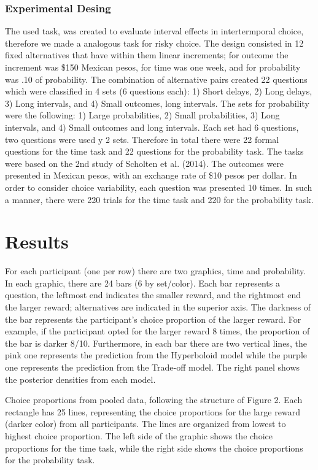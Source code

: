 \documentclass[jou,apacite]{apa6}
\begin{document}
\subsubsection{Experimental Desing}
The used task, was created to evaluate interval effects in intertermporal choice, therefore we made a analogous task for risky choice. The design consisted in 12 fixed alternatives that have within them linear increments; for outcome the increment was \$150 Mexican pesos, for time was one week, and for probability was .10 of probability. The combination of alternative pairs created 22 questions which were classified in 4 sets (6 questions each): 1) Short delays, 2) Long delays, 3) Long intervals, and 4) Small outcomes, long intervals. The sets for probability were the following: 1) Large probabilities, 2) Small probabilities, 3) Long intervals, and 4) Small outcomes and long intervals. Each set had 6 questions, two questions were used y 2 sets. Therefore in total there were 22 formal questions for the time task and 22 questions for the probability task. The tasks were based on the 2nd study of Scholten et al. (2014). The outcomes were presented in Mexican pesos, with an exchange rate of \$10 pesos per dollar. In order to consider choice variability, each question was presented 10 times. In such a manner, there were 220 trials for the time task and 220 for the probability task. 

\section{Results}

For each participant (one per row) there are two graphics, time and probability. In each graphic, there are 24 bars (6 by set/color). Each bar represents a question, the leftmost end indicates the smaller reward, and the rightmost end the larger reward; alternatives are indicated in the superior axis. The darkness of the bar represents the participant's choice proportion of the larger reward. For example, if the participant opted for the larger reward 8 times, the proportion of the bar is darker 8/10. Furthermore, in each bar there are two vertical lines, the pink one represents the prediction from the Hyperboloid model while the purple one represents the prediction from the Trade-off model. The right panel shows the posterior densities from each model. 



Choice proportions from pooled data, following the structure of Figure 2. Each rectangle has 25 lines, representing the choice proportions for the large reward (darker color) from all participants. The lines are organized from lowest to highest choice proportion. The left side of the graphic shows the choice proportions for the time task, while the right side shows the choice proportions for the probability task. 
\end{document}
